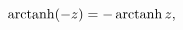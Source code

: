 \[\mathop{\mathrm{arctanh}\/}\nolimits\!\left(-z\right)=-\mathop{\mathrm{arctanh%
}\/}\nolimits z,\]